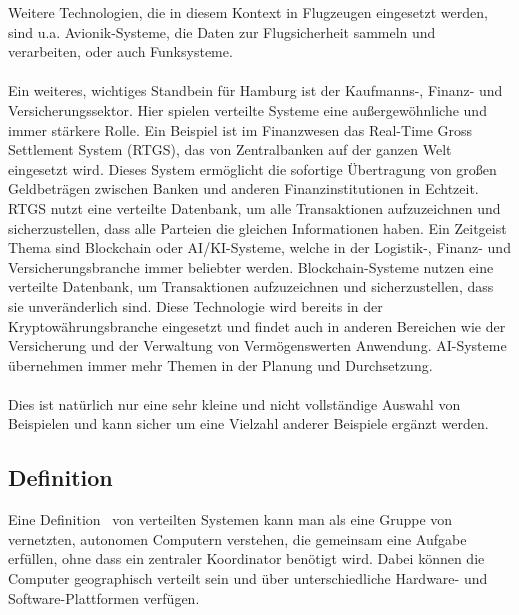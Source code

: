 \documentclass[../vs-script-first-v01.tex]{subfiles}
\begin{document}
Weitere Technologien, die in diesem Kontext in Flugzeugen eingesetzt werden, sind u.a. Avionik-Systeme, die Daten zur Flugsicherheit sammeln und verarbeiten, oder auch Funksysteme.
\\\\
Ein weiteres, wichtiges Standbein für Hamburg ist der Kaufmanns-, Finanz- und Versicherungssektor. Hier spielen verteilte Systeme eine außergewöhnliche und immer stärkere Rolle. Ein Beispiel ist im Finanzwesen das Real-Time Gross Settlement System (RTGS)\cite{rtgs}, das von Zentralbanken auf der ganzen Welt eingesetzt wird. Dieses System ermöglicht die sofortige Übertragung von großen Geldbeträgen zwischen Banken und anderen Finanzinstitutionen in Echtzeit. RTGS nutzt eine verteilte Datenbank, um alle Transaktionen aufzuzeichnen und sicherzustellen, dass alle Parteien die gleichen Informationen haben.
Ein Zeitgeist Thema sind Blockchain\cite{blockchain} oder AI/KI-Systeme, welche in der Logistik-, Finanz- und Versicherungsbranche immer beliebter werden. Blockchain-Systeme nutzen eine verteilte Datenbank, um Transaktionen aufzuzeichnen und sicherzustellen, dass sie unveränderlich sind. Diese Technologie wird bereits in der Kryptowährungsbranche eingesetzt und findet auch in anderen Bereichen wie der Versicherung und der Verwaltung von Vermögenswerten Anwendung. AI-Systeme übernehmen immer mehr Themen in der Planung und Durchsetzung.
\\\\
Dies ist natürlich nur eine sehr kleine und nicht vollständige Auswahl von Beispielen und kann sicher um eine Vielzahl anderer Beispiele ergänzt werden. 


\newpage
\subsection{Definition}

Eine Definition~\cite{coulouris2012distributed} von verteilten Systemen kann man als eine Gruppe von vernetzten, autonomen Computern verstehen, die gemeinsam eine Aufgabe erfüllen, ohne dass ein zentraler Koordinator benötigt wird. Dabei können die Computer geographisch verteilt sein und über unterschiedliche Hardware- und Software-Plattformen verfügen.
\end{document}
